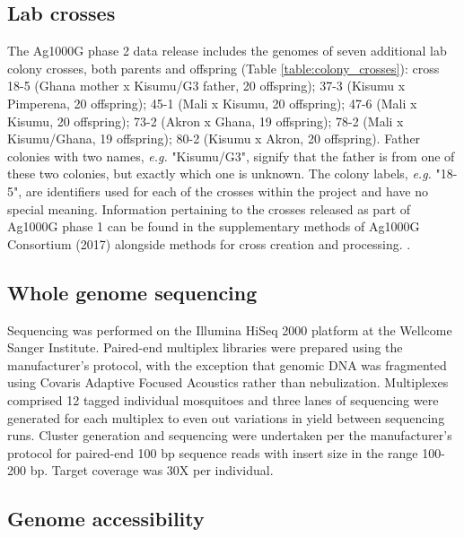 \documentclass[a4paper,11pt,abstracton,hidelinks]{scrartcl}
\begin{document}
\subsection*{Lab crosses}

The Ag1000G phase 2 data release includes the genomes of seven additional lab colony crosses, both parents and offspring (Table \ref{table:colony_crosses}):
%
cross 18-5 (Ghana mother x Kisumu/G3 father, 20 offspring); 37-3 (Kisumu x Pimperena, 20 offspring); 45-1 (Mali x Kisumu, 20 offspring); 47-6 (Mali x Kisumu, 20 offspring); 73-2 (Akron x Ghana, 19 offspring); 78-2 (Mali x Kisumu/Ghana, 19 offspring); 80-2 (Kisumu x Akron, 20 offspring).
%
Father colonies with two names, \textit{e.g.} "Kisumu/G3", signify that the father is from one of these two colonies, but exactly which one is unknown.
%
The	colony labels, \textit{e.g.}	"18-5", are	identifiers used for	
each of the crosses	within the project and	have no special meaning.	
%
Information pertaining to the crosses released as part of Ag1000G phase 1 can be found in the supplementary methods of Ag1000G Consortium (2017) alongside methods for cross creation and processing. \cite{Ag1000G2017}.


\subsection*{Whole genome sequencing}

%
Sequencing was performed on the Illumina HiSeq 2000 platform at the Wellcome Sanger Institute.
%
Paired-end multiplex libraries were prepared using the manufacturer's protocol, with the exception that genomic DNA was fragmented using Covaris Adaptive Focused Acoustics rather than nebulization.
%
Multiplexes comprised 12 tagged individual mosquitoes and three lanes of sequencing were generated for each multiplex to even out variations in yield between sequencing runs.
%
Cluster generation and sequencing were undertaken per the manufacturer's protocol for paired-end 100 bp sequence reads with insert size in the range 100-200 bp.
%
Target coverage was 30X per individual.


\subsection*{Genome accessibility}
\end{document}
